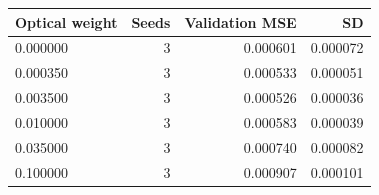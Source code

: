\begin{tabular}{lrrr}
\toprule
Optical weight & Seeds & Validation MSE & SD \\
\midrule
0.000000 & 3 & 0.000601 & 0.000072 \\
0.000350 & 3 & 0.000533 & 0.000051 \\
0.003500 & 3 & 0.000526 & 0.000036 \\
0.010000 & 3 & 0.000583 & 0.000039 \\
0.035000 & 3 & 0.000740 & 0.000082 \\
0.100000 & 3 & 0.000907 & 0.000101 \\
\bottomrule
\end{tabular}
